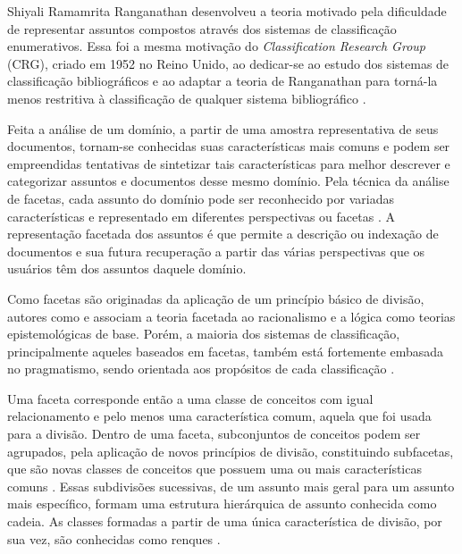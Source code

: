 Shiyali Ramamrita Ranganathan desenvolveu a teoria motivado pela dificuldade de representar assuntos compostos através dos sistemas de classificação enumerativos. Essa foi a mesma motivação do \textit{Classification Research Group} (CRG), criado em 1952 no Reino Unido, ao dedicar-se ao estudo dos sistemas de classificação bibliográficos e ao adaptar a teoria de Ranganathan para torná-la menos restritiva à classificação de qualquer sistema bibliográfico \cite{garfield1984,broughton2006}.

Feita a análise de um domínio, a partir de uma amostra representativa de seus documentos, tornam-se conhecidas suas características mais comuns e podem ser empreendidas tentativas de sintetizar tais características para melhor descrever e categorizar assuntos e documentos desse mesmo domínio. Pela técnica da análise de facetas, cada assunto do domínio pode ser reconhecido por variadas características e representado em diferentes perspectivas ou facetas \cite[p. 58]{lima04spiteri}. A representação facetada dos assuntos é que permite a descrição ou indexação de documentos e sua futura recuperação a partir das várias perspectivas que os usuários têm dos assuntos daquele domínio.

Como facetas são originadas da aplicação de um princípio básico de divisão, autores como  e  associam a teoria facetada ao racionalismo e a lógica como teorias epistemológicas de base. Porém, a maioria dos sistemas de classificação, principalmente aqueles baseados em facetas, também está fortemente embasada no pragmatismo, sendo orientada aos propósitos de cada classificação \cite{hjorland2002domain,campos04,broughton2006}.

Uma faceta corresponde então a uma classe de conceitos com igual relacionamento e pelo menos uma característica comum, aquela que foi usada para a divisão. Dentro de uma faceta, subconjuntos de conceitos podem ser agrupados, pela aplicação de novos princípios de divisão, constituindo subfacetas, que são novas classes de conceitos que possuem uma ou mais características comuns \cite[p. 58]{lima04spiteri}. Essas subdivisões sucessivas, de um assunto mais geral para um assunto mais específico, formam uma estrutura hierárquica de assunto conhecida como cadeia. As classes formadas a partir de uma única característica de divisão, por sua vez, são conhecidas como renques \cite[p. 62]{lima04spiteri}. 

